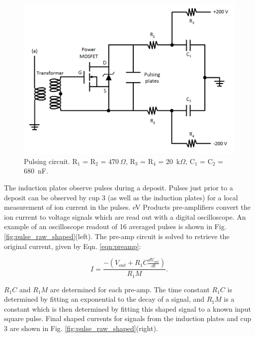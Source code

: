 \begin{figure} %
        \centering
                \includegraphics[width=.85\textwidth]{figures/pulsing_circuit.png}
                \caption{Pulsing circuit.  R$_{1}$ = R$_{2}$ = $470~\Omega$, R$_{3}$ = R$_{4}$ = 20~k$\Omega$, \newline C$_{1}$ = C$_{2}$ = 680~nF. \cite{Shon}}
\label{fig:pulse_circuit}
\end{figure}

The induction plates observe pulses during a deposit.  Pulses just prior to a deposit can be observed by cup 3 (as well as the induction plates) for a local measurement of ion current in the pulses.  eV Products pre-amplifiers convert the ion current to voltage signals which are read out with a digital oscilloscope.  An example of an oscilloscope readout of 16 averaged pulses is shown in Fig. \ref{fig:pulse_raw_shaped}(left).  The pre-amp circuit is solved to retrieve the original current, given by Eqn. \ref{eqn:preamp}:

\begin{equation}
I = \frac{-(V_{out} + R_{1} C \frac{dV_{out}}{dt})}{R_{1} M}.
\label{eqn:preamp}
\end{equation}

\noindent
$R_{1} C$ and $R_{1} M$ are determined for each pre-amp.  The time constant $R_{1} C$ is determined by fitting an exponential to the decay of a signal, and $R_{1} M$ is a constant which is then determined by fitting this shaped signal to a known input square pulse.  Final shaped currents for signals from the induction plates and cup 3 are shown in Fig. \ref{fig:pulse_raw_shaped}(right).

